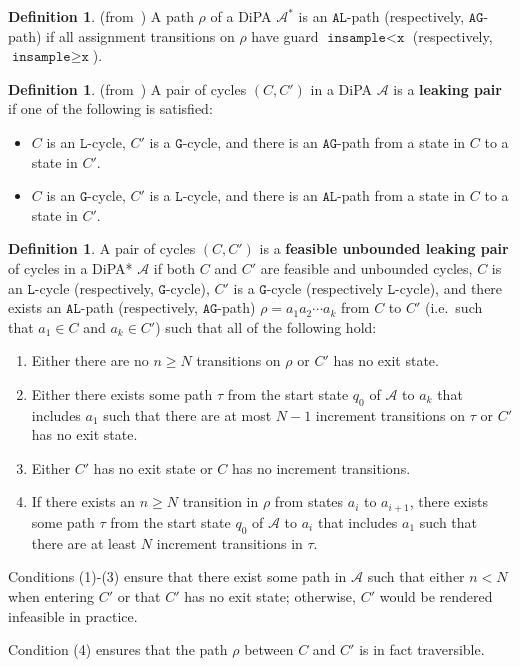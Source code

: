 \documentclass[12pt]{article}
\newcommand{\gguard}{\texttt{insample}\geq \texttt{x}}
\newcommand{\lguard}{\texttt{insample} < \texttt{x}}
\theoremstyle{definition}
\newtheorem{defn}[thm]{Definition}
\begin{document}
\begin{defn} (from~\cite{chadhaLinearTimeDecidability2021}) A path $\rho$ of a DiPA $\mathcal{A}^*$ is an $\texttt{AL}$-path (respectively, $\texttt{AG}$-path) if all assignment transitions on $\rho$ have guard $\lguard$ (respectively, $\gguard$).
\end{defn}

\begin{defn} (from~\cite{chadhaLinearTimeDecidability2021})	
	A pair of cycles $(C, C')$ in a DiPA $\mathcal{A}$ is a \textbf{leaking pair} if one of the following is satisfied:
	\begin{itemize}
		\item $C$ is an $\texttt{L}$-cycle, $C'$ is a $\texttt{G}$-cycle, and there is an $\texttt{AG}$-path from a state in $C$ to a state in $C'$.
		\item $C$ is an $\texttt{G}$-cycle, $C'$ is a $\texttt{L}$-cycle, and there is an $\texttt{AL}$-path from a state in $C$ to a state in $C'$.
	\end{itemize}
\end{defn}

\begin{defn}
	A pair of cycles $(C, C')$ is a \textbf{feasible unbounded leaking pair} of cycles in a DiPA* $\mathcal{A}$ if both $C$ and $C'$ are feasible and unbounded cycles, $C$ is an $\texttt{L}$-cycle (respectively, $\texttt{G}$-cycle), $C'$ is a $\texttt{G}$-cycle (respectively $\texttt{L}$-cycle), and there exists an $\texttt{AL}$-path (respectively, $\texttt{AG}$-path) $\rho = a_1 a_2\cdots a_k$ from $C$ to $C'$ (i.e.\ such that $a_1\in C$ and $a_k \in C'$) such that all of the following hold:
	\begin{enumerate}
		\item Either there are no $n \geq N$ transitions on $\rho$ or $C'$ has no exit state.
		\item Either there exists some path $\tau$ from the start state $q_0$ of $\mathcal{A}$ to $a_k$ that includes $a_1$ such that there are at most $N-1$ increment transitions on $\tau$ or $C'$ has no exit state.
		\item Either $C'$ has no exit state or $C$ has no increment transitions.
		\item If there exists an $n\geq N$ transition in $\rho$ from states $a_i$ to $a_{i+1}$, there exists some path $\tau$ from the start state $q_0$ of $\mathcal{A}$ to $a_i$ that includes $a_1$ such that there are at least $N$ increment transitions in $\tau$.
	\end{enumerate}

	Conditions (1)-(3) ensure that there exist some path in $\mathcal{A}$ such that either $n < N$ when entering $C'$ or that $C'$ has no exit state; otherwise, $C'$ would be rendered infeasible in practice.
	
	Condition (4) ensures that the path $\rho$ between $C$ and $C'$ is in fact traversible. 

	
\end{defn}
\end{document}
